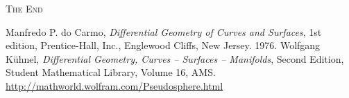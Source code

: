 \documentclass[a4paper]{article}
\numberwithin{equation}{section}
\begin{document}
\vspace{1cm}
\begin{center}
\textsc{The End}
\end{center}
\newpage
\begin{thebibliography}{999}
 Manfredo P. do Carmo, \textit{Differential Geometry of Curves and Surfaces}, 1st edition,  Prentice-Hall, Inc., Englewood Cliffs, New Jersey. 1976.
 Wolfgang K\"{u}hnel, \textit{Differential Geometry, Curves – Surfaces – Manifolds}, Second Edition, Student Mathematical Library, Volume 16, AMS.
 \url{http://mathworld.wolfram.com/Pseudosphere.html}
\end{thebibliography}
\end{document}
